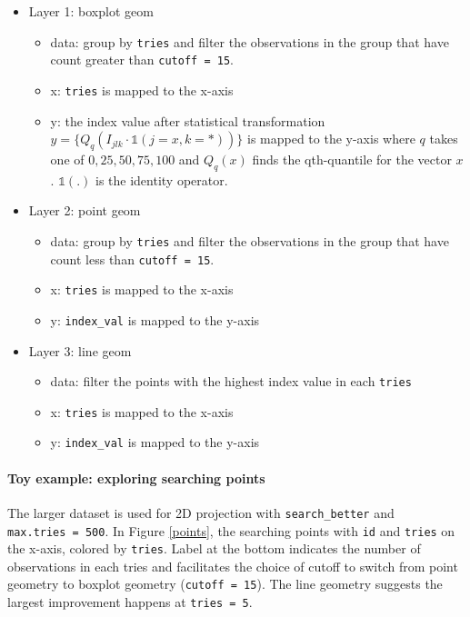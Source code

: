 \documentclass[12pt]{article}
\providecommand{\tightlist}{%
  \setlength{\itemsep}{0pt}\setlength{\parskip}{0pt}}
\begin{document}
\begin{itemize}
\tightlist
\item
  Layer 1: boxplot geom

  \begin{itemize}
  \tightlist
  \item
    data: group by \texttt{tries} and filter the observations in the
    group that have count greater than \texttt{cutoff\ =\ 15}.
  \item
    x: \texttt{tries} is mapped to the x-axis
  \item
    y: the index value after statistical transformation
    \(y = \{Q_q(I_{jlk} \cdot \mathds{1} (j = x, k = \ast))\}\) is
    mapped to the y-axis where \(q\) takes one of \(0, 25, 50, 75, 100\)
    and \(Q_q(x)\) finds the qth-quantile for the vector \(x\).
    \(\mathds{1}(.)\) is the identity operator.
  \end{itemize}
\item
  Layer 2: point geom

  \begin{itemize}
  \tightlist
  \item
    data: group by \texttt{tries} and filter the observations in the
    group that have count less than \texttt{cutoff\ =\ 15}.
  \item
    x: \texttt{tries} is mapped to the x-axis
  \item
    y: \texttt{index\_val} is mapped to the y-axis
  \end{itemize}
\item
  Layer 3: line geom

  \begin{itemize}
  \tightlist
  \item
    data: filter the points with the highest index value in each
    \texttt{tries}
  \item
    x: \texttt{tries} is mapped to the x-axis
  \item
    y: \texttt{index\_val} is mapped to the y-axis
  \end{itemize}
\end{itemize}

\hypertarget{toy-example-exploring-searching-points}{%
\paragraph{Toy example: exploring searching
points}\label{toy-example-exploring-searching-points}}

The larger dataset is used for 2D projection with
\texttt{search\_better} and \texttt{max.tries\ =\ 500}. In Figure
\ref{points}, the searching points with \texttt{id} and \texttt{tries}
on the x-axis, colored by \texttt{tries}. Label at the bottom indicates
the number of observations in each tries and facilitates the choice of
cutoff to switch from point geometry to boxplot geometry
(\texttt{cutoff\ =\ 15}). The line geometry suggests the largest
improvement happens at \texttt{tries\ =\ 5}.
\end{document}

